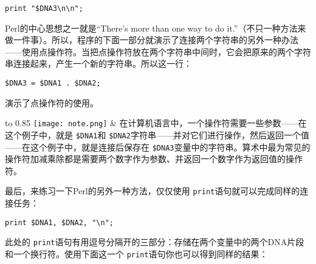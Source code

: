 \begin{lstlisting}
print "$DNA3\n\n";
\end{lstlisting}

Perl的中心思想之一就是“There's more than one way to do it.”（不只一种方法来做一件事）。所以，程序的下面一部分就演示了连接两个字符串的另外一种办法——使用点操作符。当把点操作符放在两个字符串中间时，它会把原来的两个字符串连接起来，产生一个新的字符串。所以这一行：

\begin{lstlisting}
$DNA3 = $DNA1 . $DNA2;
\end{lstlisting}
演示了点操作符的使用。


\vspace{-5pt}
\begin{table}[h]
  \begin{center}
    \begin{tabu*} to 0.85\linewidth {|X[1,r,m]X[15,l,m]|}
      \tabucline{-}
      \texttt{[image: note.png]} &
      在计算机语言中，一个操作符需要一些参数——在这个例子中，就是 \verb|$DNA1|和 \verb|$DNA2|字符串——并对它们进行操作，然后返回一个值——在这个例子中，就是连接后保存在 \verb|$DNA3|变量中的字符串。算术中最为常见的操作符加减乘除都是需要两个数字作为参数、并返回一个数字作为返回值的操作符。\\
      \tabucline{-}
    \end{tabu*}
  \end{center}
\end{table}
\vspace{-20pt}

最后，来练习一下Perl的另外一种方法，仅仅使用 \verb|print|语句就可以完成同样的连接任务：

\begin{lstlisting}
print $DNA1, $DNA2, "\n";
\end{lstlisting}

此处的 \verb|print|语句有用逗号分隔开的三部分：存储在两个变量中的两个DNA片段和一个换行符。使用下面这一个 \verb|print|语句你也可以得到同样的结果：

